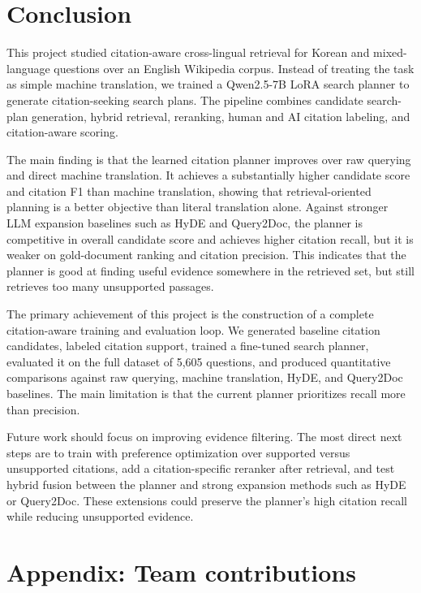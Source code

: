 \documentclass{article}
\begin{document}
\section{Conclusion}
\label{sec:conclusion}

This project studied citation-aware cross-lingual retrieval for Korean and mixed-language questions over an English Wikipedia corpus. Instead of treating the task as simple machine translation, we trained a Qwen2.5-7B LoRA search planner to generate citation-seeking search plans. The pipeline combines candidate search-plan generation, hybrid retrieval, reranking, human and AI citation labeling, and citation-aware scoring.

The main finding is that the learned citation planner improves over raw querying and direct machine translation. It achieves a substantially higher candidate score and citation F1 than machine translation, showing that retrieval-oriented planning is a better objective than literal translation alone. Against stronger LLM expansion baselines such as HyDE and Query2Doc, the planner is competitive in overall candidate score and achieves higher citation recall, but it is weaker on gold-document ranking and citation precision. This indicates that the planner is good at finding useful evidence somewhere in the retrieved set, but still retrieves too many unsupported passages.

The primary achievement of this project is the construction of a complete citation-aware training and evaluation loop. We generated baseline citation candidates, labeled citation support, trained a fine-tuned search planner, evaluated it on the full dataset of 5,605 questions, and produced quantitative comparisons against raw querying, machine translation, HyDE, and Query2Doc baselines. The main limitation is that the current planner prioritizes recall more than precision.

Future work should focus on improving evidence filtering. The most direct next steps are to train with preference optimization over supported versus unsupported citations, add a citation-specific reranker after retrieval, and test hybrid fusion between the planner and strong expansion methods such as HyDE or Query2Doc. These extensions could preserve the planner's high citation recall while reducing unsupported evidence.




\newpage
\appendix

\section{Appendix: Team contributions}
\end{document}
